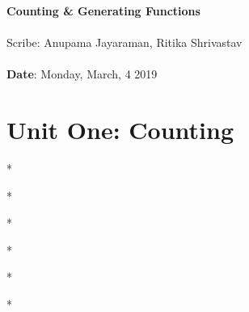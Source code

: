 \documentclass[11pt,twosided]{article}
\def\titlestring{Counting \& Generating Functions}
\def\scribestring{Anupama Jayaraman, Ritika Shrivastav}
\def\datestring{Monday, March, 4 2019}
\begin{document}
\thispagestyle{plain}  %

\noindent
{\LARGE \textbf{\titlestring}}\\\\
%
{\Large Scribe: \scribestring}\\ \\
{\textbf{Date}: \datestring}


\noindent

\section{Unit One: Counting}

\begin{center} * \end{center}
\begin{center} *\space\space\space\space* \end{center}
\begin{center} *\space\space\space\space*\space\space\space\space* \end{center}
\begin{center} *\space\space\space\space*\space\space\space\space*\space\space\space\space* \end{center}
\begin{center} *\space\space\space\space*\space\space\space\space*\space\space\space\space*\space\space\space\space* \end{center}
\begin{center} *\space\space\space\space*\space\space\space\space*\space\space\space\space*\space\space\space\space*\space\space\space\space* \end{center}
\newline \newline
\end{document}
